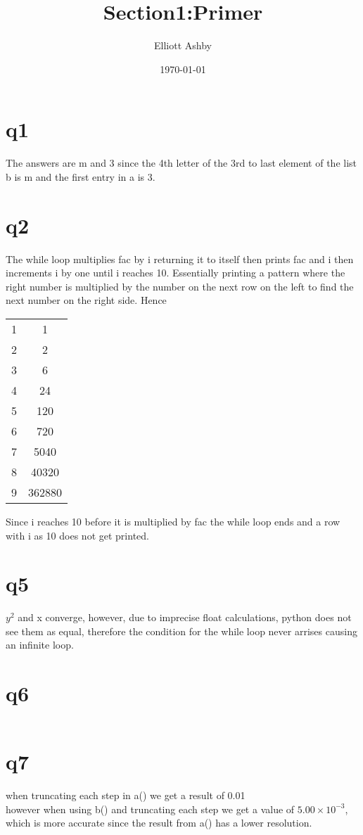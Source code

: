 \documentclass[a4paper,english]{article}
\title{Section1:Primer}
\author{Elliott Ashby}
\date{\today}
\begin{document}
    \maketitle
    \section{q1}
        The answers are m and 3 since the 4th letter of the 3rd to last element of the list b is m and the first entry in a is 3.
    \section{q2}
       The while loop multiplies fac by i returning it to itself then prints fac and i then increments
       i by one until i reaches 10. Essentially printing a pattern where the right number is multiplied by the 
       number on the next row on the left to find the next number on the right side. Hence \\
       \begin{center}
           \begin{tabular}{ |c|c| }
                1 & 1 \\
                2 & 2 \\
                3 & 6 \\
                4 & 24 \\
                5 & 120 \\
                6 & 720 \\
                7 & 5040 \\
                8 & 40320 \\
                9 & 362880
           \end{tabular}
       \end{center}
       Since i reaches 10 before it is multiplied by fac the while loop ends and a row with i as 10 does not get printed.
    \section{q5}
       $y^2$ and x converge, however, due to imprecise float calculations, python does not see them as equal, therefore the condition for the while loop never arrises causing an infinite loop.
    \section{q6}
       \begin{center}
           \begin{tabular}{ |c|c| }
               
           \end{tabular}
       \end{center}
    \section{q7}
        when truncating each step in a() we get a result of 0.01 \\ however when using b() and truncating each step we get a value of $5.00\times10^{-3}$, which is more accurate since the result from a() has a lower resolution.
        
\end{document}
